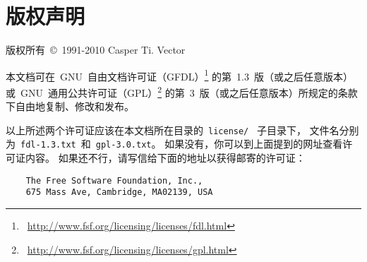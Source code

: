 \cleardoublepage
\chapter*{\textbf{版权声明}}
{
\begin{comment}
	任何收存和保管本论文各种版本的单位和个人，
	未经本论文作者同意，不得将本论文转借他人，
	亦不得随意复制、抄录、拍照或以任何方式传播。
	否则一旦引起有碍作者著作权之问题，将可能承担法律责任。
\end{comment}
	版权所有~\copyright~1991-2010 Casper Ti. Vector

	本文档可在~GNU~自由文档许可证（GFDL）\footnote%
	{\ \url{http://www.fsf.org/licensing/licenses/fdl.html}}%
	的第~1.3~版（或之后任意版本）或~GNU~通用公共许可证（GPL）\footnote%
	{\ \url{http://www.fsf.org/licensing/licenses/gpl.html}}%
	的第~3~版（或之后任意版本）所规定的条款下自由地复制、修改和发布。
	
	以上所述两个许可证应该在本文档所在目录的~\verb|license/|~%
	\linebreak[1]子目录下，
	文件名分别为~\verb|fdl-1.3.txt|~和~\verb|gpl-3.0.txt|。
	如果没有，你可以到上面提到的网址查看许可证内容。
	如果还不行，请写信给下面的地址以获得邮寄的许可证：
\begin{verbatim}
    The Free Software Foundation, Inc.,
    675 Mass Ave, Cambridge, MA02139, USA 
\end{verbatim}
	\par
}

